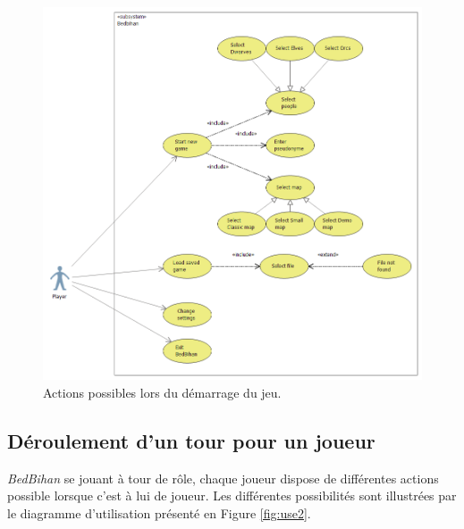 		\begin{figure}
			\begin{center}
				\includegraphics[width=1\textwidth]{figure/cas_utilisation_launch.png}
			\end{center}
			\caption{Actions possibles lors du démarrage du jeu.}
			\label{fig:use1}
		\end{figure}


	\subsection{Déroulement d'un tour pour un joueur}

		\emph{BedBihan} se jouant à tour de rôle, chaque joueur dispose de différentes actions possible lorsque c'est à lui de joueur. Les différentes possibilités sont illustrées par le diagramme d'utilisation présenté en {\sc Figure} \ref{fig:use2}.

